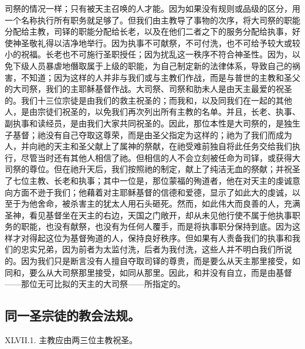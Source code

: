 司祭的情况一样；只有被天主召唤的人才能。因为如果没有规则或品级的区分，用一个名称执行所有职务就足够了。但我们由主教导了事物的次序，将大司祭的职能分配给主教，司铎的职能分配给长老，以及在他们二者之下的服务分配给执事，好使神圣敬礼得以洁净地举行。因为执事不可献祭，不可付洗，也不可给予较大或较小的祝福。长老也不可施行圣职授任；因为扰乱这一秩序不符合神圣性。因为，以免下级人员暴虐地僭取属于上级的职能，为自己制定新的法律体系，导致自己的祸害，不知道；因为这样的人并非与我们或与主教们作战，而是与普世的主教和圣父的大司祭，我们的主耶稣基督作战。大司祭、司祭和肋未人是由天主最爱的祝圣的。我们十三位宗徒是由我们的救主祝圣的；而我和，以及同我们在一起的其他人，是由宗徒们祝圣的，以免我们再次列出所有主教的名单。并且，长老、执事、副执事和读经员，是由我们大家共同祝圣的。因此，那位本性是大司祭的，是独生子基督；祂没有自己夺取这尊荣，而是由圣父指定为这样的；祂为了我们而成为人，并向祂的天主和圣父献上了属神的祭献，在祂受难前独自将此任务交给我们执行，尽管当时还有其他人相信了祂。但相信的人不会立刻被任命为司铎，或获得大司祭的尊位。但在祂升天后，我们按照祂的制定，献上了纯洁无血的祭献；并祝圣了七位主教、长老和执事；其中一位是，那位蒙福的殉道者，他在对天主的虔诚意向方面不逊于我们；他藉着对主耶稣基督的信德和爱德，显示了如此大的虔诚，以至于为他舍命，被杀害主的犹太人用石头砸死。然而，如此伟大而良善的人，充满圣神，看见基督坐在天主的右边，天国之门敞开，却从未见他行使不属于他执事职务的职能，也没有献祭，也没有为任何人覆手，而是将执事职分保持到底。因为这样才对得起这位为基督殉道的人，保持良好秩序。但如果有人责备我们的执事和我们的忠实兄弟，因为前者为太监付洗，后者为我付洗，这些人并不明白我们所说的。因为我们只是断言没有人擅自夺取司铎的尊贵，而是要么从天主那里接受，如同和，要么从大司祭那里接受，如同从那里。因此，和并没有自立，而是由基督——那位无可比拟的天主的大司祭——所指定的。\par


\subsection{同一圣宗徒的教会法规。}

XLVII.1. 主教应由两三位主教祝圣。\par


